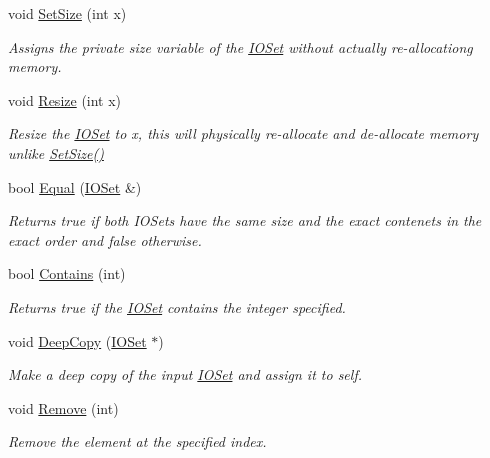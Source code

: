 \begin{DoxyCompactItemize}
void \hyperlink{class_i_o_set_a45a883dcdfae7eafbc303039727bdf49}{SetSize} (int x)
\begin{DoxyCompactList}\small\item\em Assigns the private size variable of the \hyperlink{class_i_o_set}{IOSet} without actually re-\/allocationg memory. \item\end{DoxyCompactList}\item 
void \hyperlink{class_i_o_set_a31b2d68680061f676892b70954b55102}{Resize} (int x)
\begin{DoxyCompactList}\small\item\em Resize the \hyperlink{class_i_o_set}{IOSet} to x, this will physically re-\/allocate and de-\/allocate memory unlike \hyperlink{class_i_o_set_a45a883dcdfae7eafbc303039727bdf49}{SetSize()} \item\end{DoxyCompactList}\item 
bool \hyperlink{class_i_o_set_adf73ea0bebbddbb1136d26fc9f6dddba}{Equal} (\hyperlink{class_i_o_set}{IOSet} \&)
\begin{DoxyCompactList}\small\item\em Returns true if both IOSets have the same size and the exact contenets in the exact order and false otherwise. \item\end{DoxyCompactList}\item 
bool \hyperlink{class_i_o_set_a928b470720d1ce878a73a06f39647de9}{Contains} (int)
\begin{DoxyCompactList}\small\item\em Returns true if the \hyperlink{class_i_o_set}{IOSet} contains the integer specified. \item\end{DoxyCompactList}\item 
void \hyperlink{class_i_o_set_ae416909c86424400c72de7317346c733}{DeepCopy} (\hyperlink{class_i_o_set}{IOSet} $\ast$)
\begin{DoxyCompactList}\small\item\em Make a deep copy of the input \hyperlink{class_i_o_set}{IOSet} and assign it to self. \item\end{DoxyCompactList}\item 
void \hyperlink{class_i_o_set_a0021b9c44555444066dbb068f253a71c}{Remove} (int)
\begin{DoxyCompactList}\small\item\em Remove the element at the specified index. \item\end{DoxyCompactList}\item 

\end{DoxyCompactItemize}
